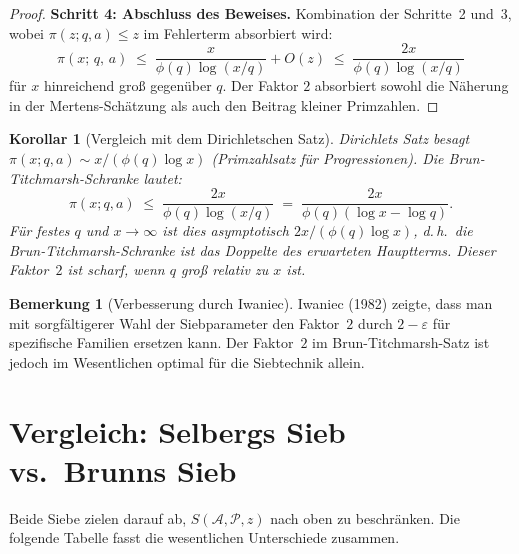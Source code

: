 \documentclass[12pt,a4paper]{amsart}
\newtheorem{korollar}[theorem]{Korollar}
\theoremstyle{definition}
\newtheorem{bemerkung}[theorem]{Bemerkung}
\begin{document}
\begin{proof}
  \textbf{Schritt 4: Abschluss des Beweises.}
  Kombination der Schritte~2 und~3, wobei $\pi(z;q,a) \leq z$ im Fehlerterm absorbiert wird:
  \[
    \pi(x;\,q,\,a)
    \;\leq\; \frac{x}{\phi(q)\log(x/q)} + O(z)
    \;\leq\; \frac{2x}{\phi(q)\log(x/q)}
  \]
  für $x$ hinreichend groß gegenüber $q$.  Der Faktor $2$ absorbiert
  sowohl die Näherung in der Mertens-Schätzung als auch den Beitrag kleiner
  Primzahlen.
\end{proof}

\begin{korollar}[Vergleich mit dem Dirichletschen Satz]\label{kor:dirichlet}
  Dirichlets Satz besagt $\pi(x;q,a) \sim x/(\phi(q)\log x)$ (Primzahlsatz
  für Progressionen).  Die Brun-Titchmarsh-Schranke lautet:
  \[
    \pi(x;q,a) \;\leq\; \frac{2x}{\phi(q)\log(x/q)} \;=\; \frac{2x}{\phi(q)(\log x - \log q)}.
  \]
  Für festes $q$ und $x \to \infty$ ist dies asymptotisch $2x/(\phi(q)\log x)$,
  d.\,h.\ die Brun-Titchmarsh-Schranke ist das \emph{Doppelte} des erwarteten
  Hauptterms.  Dieser Faktor~$2$ ist scharf, wenn $q$ groß relativ zu $x$ ist.
\end{korollar}

\begin{bemerkung}[Verbesserung durch Iwaniec]
  Iwaniec (1982) zeigte, dass man mit sorgfältigerer Wahl der Siebparameter
  den Faktor~$2$ durch $2-\varepsilon$ für spezifische Familien ersetzen kann.
  Der Faktor~$2$ im Brun-Titchmarsh-Satz ist jedoch im Wesentlichen optimal
  für die Siebtechnik allein.
\end{bemerkung}

\section{Vergleich: Selbergs Sieb vs.\ Brunns Sieb}
\label{sec:vergleich}

Beide Siebe zielen darauf ab, $S(\mathcal{A},\mathcal{P},z)$ nach oben zu beschränken.
Die folgende Tabelle fasst die wesentlichen Unterschiede zusammen.
\end{document}
